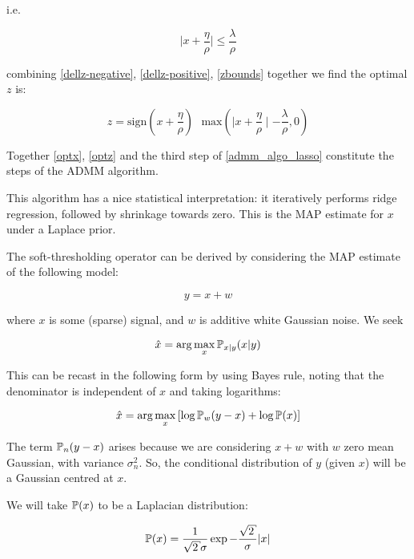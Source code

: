 i.e.

\begin{equation}
\mid x+ \frac{\eta}{\rho}\mid \leq \frac{\lambda}{\rho}
\label{zbounds}
\end{equation}

combining \eqref{dellz-negative}, \eqref{dellz-positive}, \eqref{zbounds} together we find the optimal \(z\) is:

\begin{equation}
z = \mathrm{sign}(x+\frac{\eta}{\rho})\text{ }\mathrm{max}\left( \mid x+\frac{\eta}{\rho} \mid - \frac{\lambda}{\rho} ,0\right)
\label{optz}
\end{equation}

Together \eqref{optx}, \eqref{optz} and the third step of \eqref{admm_algo_lasso} constitute the steps of the ADMM algorithm.

This algorithm has a nice statistical interpretation: it iteratively performs ridge regression, followed by shrinkage towards zero. This is the MAP estimate for \(x\) under a Laplace prior.

The soft-thresholding operator can be derived by considering the MAP estimate of the following model:

\begin{equation}
y = x + w
\end{equation}

where \(x\) is some (sparse) signal, and \(w\) is additive white Gaussian noise. We seek

\begin{equation}
\hat{x} = \arg\max_x {\mathbb{P}}_{x|y}{\left(x|y\right)}
\end{equation}

This can be recast in the following form by using Bayes rule, noting that the denominator is independent of \(x\) and taking logarithms:

\begin{equation}
\hat{x} = \arg\max_x \left[\log{{\mathbb{P}}_{w}{\left(y-x\right)}}+\log{{\mathbb{P}}{\left(x\right)}}\right]
\label{hatx}
\end{equation}

The term \({\mathbb{P}}_{n}{\left(y-x\right)}\) arises because we are considering \(x+w\) with \(w\) zero mean Gaussian, with variance \(\sigma_n^2\). So, the conditional distribution of \(y\) (given \(x\)) will be a Gaussian centred at \(x\).

We will take \({\mathbb{P}}{\left(x\right)}\) to be a Laplacian distribution:

\begin{equation}
\pr{\left(x\right)} = \frac{1}{\sqrt{2}\sigma}\exp{-\frac{\sqrt{2}}{\sigma}|x|}
\end{equation}

